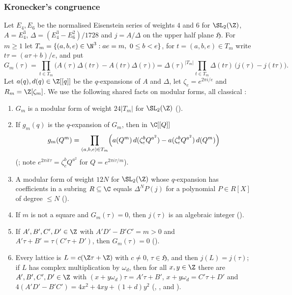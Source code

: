 \subsubsection{Kronecker's congruence}
Let $E_4,E_6$ be the normalised Eisenstein series of weights $4$ and $6$ for $\SL_2(\Z)$, $A=E_4^3$,
$\Delta=(E_4^3-E_6^2)/1728$ and $j=A/\Delta$ on the upper half plane $\mathfrak H$. For $m\ge1$ let
$T_m=\{(a,b,e)\in\N^3: ae=m,\ 0\le b<e\}$, for $t=(a,b,e)\in T_m$ write $t\tau=(a\tau+b)/e$, and put
\[
G_m(\tau)=\prod_{t\in T_m}\bigl(A(\tau)\Delta(t\tau)-A(t\tau)\Delta(\tau)\bigr)
=\Delta(\tau)^{|T_m|}\prod_{t\in T_m}\Delta(t\tau)\,\bigl(j(\tau)-j(t\tau)\bigr).
\]
Let $a(q),d(q)\in\Z[[q]]$ be the $q$-expansions of $A$ and $\Delta$, let $\zeta_e=e^{2\pi i/e}$ and
$R_m=\Z[\zeta_m]$. We use the following shared facts on modular forms, all classical
\cite[\S11]{Cox1989}:
\begin{enumerate}[label=(M\arabic*)]
\item\label{pf:reckernel:M1} $G_m$ is a modular form of weight $24|T_m|$ for $\SL_2(\Z)$
  ().
\item\label{pf:reckernel:M2} If $g_m(q)$ is the $q$-expansion of $G_m$, then in $\C[[Q]]$
  \[
  g_m(Q^m)=\prod_{(a,b,e)\in T_m}\Bigl(a(Q^m)\,d(\zeta_e^bQ^{a^2})-a(\zeta_e^bQ^{a^2})\,d(Q^m)\Bigr)
  \]
  (; note $e^{2\pi i t\tau}=\zeta_e^bQ^{a^2}$ for
  $Q=e^{2\pi i\tau/m}$).
\item\label{pf:reckernel:M3} A modular form of weight $12N$ for $\SL_2(\Z)$ whose $q$-expansion has coefficients in
  a subring $R\subseteq\C$ equals $\Delta^NP(j)$ for a polynomial $P\in R[X]$ of degree $\le N$
  ().
\item\label{pf:reckernel:M4} If $m$ is not a square and $G_m(\tau)=0$, then $j(\tau)$ is an algebraic integer
  ().
\item\label{pf:reckernel:M5} If $A',B',C',D'\in\Z$ with $A'D'-B'C'=m>0$ and $A'\tau+B'=\tau(C'\tau+D')$, then
  $G_m(\tau)=0$ ().
\item\label{pf:reckernel:M6} Every lattice is $L=c(\Z\tau+\Z)$ with $c\ne0$, $\tau\in\mathfrak H$, and then
  $j(L)=j(\tau)$; if $L$ has complex multiplication by $\omega_d$, then for all $x,y\in\Z$ there are
  $A',B',C',D'\in\Z$ with $(x+y\omega_d)\tau=A'\tau+B'$, $x+y\omega_d=C'\tau+D'$ and
  $4(A'D'-B'C')=4x^2+4xy+(1+d)y^2$ (, , and ).
\end{enumerate}

